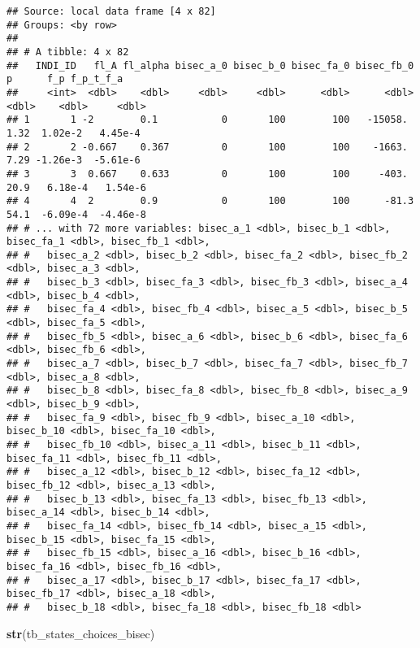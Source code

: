 \documentclass[
]{book}
\newenvironment{Shaded}{\begin{snugshade}}{\end{snugshade}}
\newcommand{\KeywordTok}[1]{\textcolor[rgb]{0.13,0.29,0.53}{\textbf{#1}}}
\newcommand{\NormalTok}[1]{#1}
\begin{document}
\begin{verbatim}
## Source: local data frame [4 x 82]
## Groups: <by row>
## 
## # A tibble: 4 x 82
##   INDI_ID   fl_A fl_alpha bisec_a_0 bisec_b_0 bisec_fa_0 bisec_fb_0     p      f_p f_p_t_f_a
##     <int>  <dbl>    <dbl>     <dbl>     <dbl>      <dbl>      <dbl> <dbl>    <dbl>     <dbl>
## 1       1 -2        0.1           0       100        100   -15058.   1.32  1.02e-2   4.45e-4
## 2       2 -0.667    0.367         0       100        100    -1663.   7.29 -1.26e-3  -5.61e-6
## 3       3  0.667    0.633         0       100        100     -403.  20.9   6.18e-4   1.54e-6
## 4       4  2        0.9           0       100        100      -81.3 54.1  -6.09e-4  -4.46e-8
## # ... with 72 more variables: bisec_a_1 <dbl>, bisec_b_1 <dbl>, bisec_fa_1 <dbl>, bisec_fb_1 <dbl>,
## #   bisec_a_2 <dbl>, bisec_b_2 <dbl>, bisec_fa_2 <dbl>, bisec_fb_2 <dbl>, bisec_a_3 <dbl>,
## #   bisec_b_3 <dbl>, bisec_fa_3 <dbl>, bisec_fb_3 <dbl>, bisec_a_4 <dbl>, bisec_b_4 <dbl>,
## #   bisec_fa_4 <dbl>, bisec_fb_4 <dbl>, bisec_a_5 <dbl>, bisec_b_5 <dbl>, bisec_fa_5 <dbl>,
## #   bisec_fb_5 <dbl>, bisec_a_6 <dbl>, bisec_b_6 <dbl>, bisec_fa_6 <dbl>, bisec_fb_6 <dbl>,
## #   bisec_a_7 <dbl>, bisec_b_7 <dbl>, bisec_fa_7 <dbl>, bisec_fb_7 <dbl>, bisec_a_8 <dbl>,
## #   bisec_b_8 <dbl>, bisec_fa_8 <dbl>, bisec_fb_8 <dbl>, bisec_a_9 <dbl>, bisec_b_9 <dbl>,
## #   bisec_fa_9 <dbl>, bisec_fb_9 <dbl>, bisec_a_10 <dbl>, bisec_b_10 <dbl>, bisec_fa_10 <dbl>,
## #   bisec_fb_10 <dbl>, bisec_a_11 <dbl>, bisec_b_11 <dbl>, bisec_fa_11 <dbl>, bisec_fb_11 <dbl>,
## #   bisec_a_12 <dbl>, bisec_b_12 <dbl>, bisec_fa_12 <dbl>, bisec_fb_12 <dbl>, bisec_a_13 <dbl>,
## #   bisec_b_13 <dbl>, bisec_fa_13 <dbl>, bisec_fb_13 <dbl>, bisec_a_14 <dbl>, bisec_b_14 <dbl>,
## #   bisec_fa_14 <dbl>, bisec_fb_14 <dbl>, bisec_a_15 <dbl>, bisec_b_15 <dbl>, bisec_fa_15 <dbl>,
## #   bisec_fb_15 <dbl>, bisec_a_16 <dbl>, bisec_b_16 <dbl>, bisec_fa_16 <dbl>, bisec_fb_16 <dbl>,
## #   bisec_a_17 <dbl>, bisec_b_17 <dbl>, bisec_fa_17 <dbl>, bisec_fb_17 <dbl>, bisec_a_18 <dbl>,
## #   bisec_b_18 <dbl>, bisec_fa_18 <dbl>, bisec_fb_18 <dbl>
\end{verbatim}

\begin{Shaded}
\begin{Highlighting}[]
\KeywordTok{str}\NormalTok{(tb_states_choices_bisec)}
\end{Highlighting}
\end{Shaded}
\end{document}
